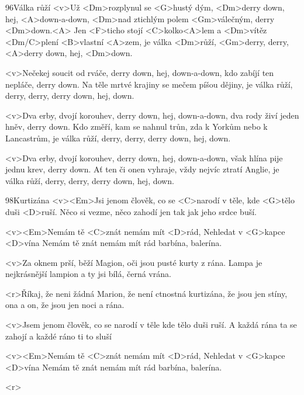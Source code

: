\begin{song}{96}{Válka růží}{}
	<v>Už <Dm>rozplynul se <G>hustý dým,
	<Dm>derry down, hej, <A>down-a-down,
	<Dm>nad ztichlým polem <Gm>válečným, derry <Dm>down.<A>
	Jen <F>ticho stojí <C>kolko<A>lem a <Dm>vítěz <Dm/C>plení <B>vlastní <A>zem,
	je válka <Dm>růží, <Gm>derry, derry, <A>derry down, hej, <Dm>down.

	<v>Nečekej soucit od rváče,
	derry down, hej, down-a-down,
	kdo zabíjí ten nepláče,	derry down.
	Na těle mrtvé krajiny se mečem píšou dějiny,
	je válka růží, derry, derry, derry down, hej, down.

	<v>Dva erby, dvojí korouhev,
	derry down, hej, down-a-down,
	dva rody živí jeden hněv, derry down.
	Kdo změří, kam se nahnul trůn, zda k Yorkům nebo k Lancastrům,
	je válka růží, derry, derry, derry down, hej, down.

	<v>Dva erby, dvojí korouhev,
	derry down, hej, down-a-down,
	však hlína pije jednu krev, derry down.
	Ať ten či onen vyhraje, vždy nejvíc ztratí Anglie,
	je válka růží, derry, derry, derry down, hej, down.
\end{song}
\begin{song}[UDG]{98}{Kurtizána}{}
	<v><Em>Jsi jenom člověk,
	co se <C>narodí
	v těle, kde <G>tělo duši <D>ruší.
	Něco si vezme, něco zahodí
	jen tak jak jeho srdce buší.

	<v><Em>Nemám tě <C>znát
	nemám mít <D>rád,
	Nehledat v <G>kapce <D>vína
	Nemám tě znát
	nemám mít rád
	barbína, balerína.

	<v>Za oknem prší, běží Magion,
	oči jsou pusté kurty z rána.
	Lampa je nejkrásnější lampion
	a ty jsi bílá, černá vrána.

	<r>Říkaj, že neni žádná Marion,
	že není ctnostná kurtizána,
	že jsou jen stíny, ona a on,
	že jsou jen noci a rána.

	<v>Jsem jenom člověk, co se narodí
	v těle kde tělo duši ruší.
	A každá rána ta se zahojí
	a každé ráno ti to sluší

	<v><Em>Nemám tě <C>znát
	nemám mít <D>rád,
	Nehledat v <G>kapce <D>vína
	Nemám tě znát
	nemám mít rád
	barbína, balerína.

	<r>
\end{song}
